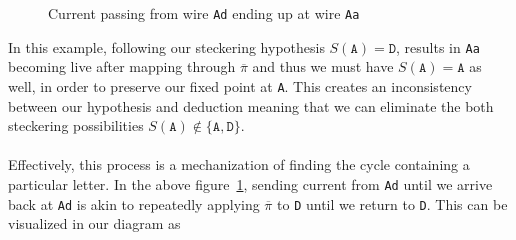 \begin{figure}[H]
\begin{minipage}{0.45\textwidth}
  \end{minipage}
  \caption{Current passing from wire \texttt{Ad} ending up at wire \texttt{Aa}}
  \label{fig:incorrect_stecker}
\end{figure}
\noindent In this example, following our steckering hypothesis
$S(\texttt{A}) = \texttt{D}$,
results in \texttt{Aa} becoming live after mapping through $\overline\pi$ and
thus we must have $S(\texttt{A}) = \texttt{A}$ as well, in order to
preserve our fixed point at \texttt{A}.
This creates an inconsistency between our hypothesis and deduction
meaning that we can eliminate the both
steckering possibilities $S(\texttt{A}) \notin \{\texttt{A},
\texttt{D}\}$.
\\\\Effectively, this process is a mechanization of
finding the cycle containing a particular letter. In the above
figure~\ref{fig:incorrect_stecker}, sending current from \texttt{Ad}
until we arrive back at \texttt{Ad} is
akin to repeatedly applying $\overline\pi$ to \texttt{D}
until we return to \texttt{D}. This can be visualized in our diagram as

